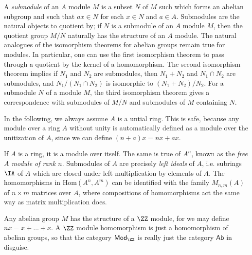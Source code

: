A \emph{submodule} of an $A$ module $M$ is a subset $N$ of $M$ such which forms an abelian subgroup and such that $ax \in N$ for each $x \in N$ and $a \in A$. Submodules are the natural objects to quotient by; if $N$ is a submodule of an $A$ module $M$, then the quotient group $M/N$ naturally has the structure of an $A$ module. The natural analogues of the isomorphism theorems for abelian groups remain true for modules. In particular, one can use the first isomorphism theorem to pass through a quotient by the kernel of a homomorphism. The second isomorphism theorem implies if $N_1$ and $N_2$ are submodules, then $N_1 + N_2$ and $N_1 \cap N_2$ are submodules, and $N_1 / (N_1 \cap N_2)$ is isomorphic to $(N_1 + N_2) / N_2$. For a submodule $N$ of a module $M$, the third isomorphism theorem gives a correspondence with submodules of $M/N$ and submodules of $M$ containing $N$.

\begin{remark}
    In the following, we always assume $A$ is a untial ring. This is safe, because any module over a ring $A$ without unity is automatically defined as a module over the unitization of $A$, since we can define $(n + a)x = nx + ax$.
\end{remark}

\begin{example}
    If $A$ is a ring, it is a module over itself. The same is true of $A^n$, known as the \emph{free $A$ module of rank $n$}. Submodules of $A$ are precisely \emph{left ideals} of $A$, i.e. subrings $\IA$ of $A$ which are closed under left multiplication by elements of $A$. The homomorphisms in $\text{Hom}(A^n,A^m)$ can be identified with the family $M_{n,m}(A)$ of $n \times m$ matrices over $A$, where compositions of homomorphisms act the same way as matrix multiplication does.
\end{example}

\begin{example}
    Any abelian group $M$ has the structure of a $\ZZ$ module, for we may define $nx = x + \dots + x$. A $\ZZ$ module homomorphism is just a homomorphism of abelian groups, so that the category $\mathsf{Mod}_{\ZZ}$ is really just the category $\mathsf{Ab}$ in disguise.
\end{example}

